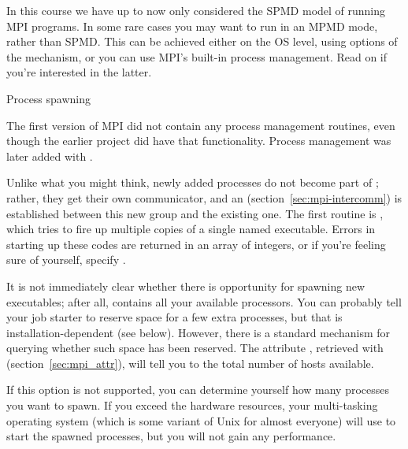 
In this course we have up to now only considered the \ac{SPMD} model
of running MPI programs.  In some rare cases you may want to run in an
\ac{MPMD} mode, rather than \ac{SPMD}. This can be achieved either on
the \ac{OS} level, using options of the  mechanism,
or you can use MPI's built-in process management. Read on if you're
interested in the latter.

 {Process spawning}
\label{sec:mpi-dynamic}

The first version of MPI did not contain any process management
routines, even though the earlier  project did have
that functionality. Process management was later added with .

Unlike what you might think, newly added processes do not become part
of ; rather, they get their own communicator, and an
 (section~\ref{sec:mpi-intercomm})
is established between this new group
and the existing one. The first routine is
, which tries to fire up multiple copies
of a single named executable. Errors in starting up these codes are returned in an array of integers, or
if you're feeling sure of yourself, specify .

It is not immediately clear whether there is opportunity for spawning
new executables; after all,  contains all
your available processors. You can probably tell your job starter to
reserve space for a few extra processes, but that is
installation-dependent (see below). However, there is a standard
mechanism for querying whether such space has been reserved.  The
attribute , retrieved with
 (section~\ref{sec:mpi_attr}), will tell
you to the total number of hosts available.

If this option is not supported, you can determine yourself how many
processes you want to spawn. If you exceed the hardware resources,
your multi-tasking operating system (which is some variant of Unix for
almost everyone) will use  to start the
spawned processes, but you will not gain any performance.

